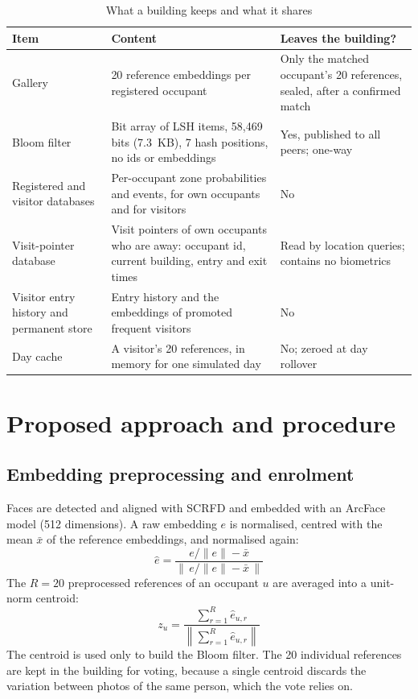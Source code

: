 \documentclass[12pt,a4paper,oneside]{report}
\begin{document}
\begin{table}[htbp]
\centering
\caption{What a building keeps and what it shares}\label{tab:stores}
{\small\setlength{\tabcolsep}{4pt}\renewcommand{\arraystretch}{1.2}
\begin{tabular}{|p{3.52cm}|p{6.06cm}|p{4.69cm}|}\hline
\textbf{Item} & \textbf{Content} & \textbf{Leaves the building?}\\\hline
Gallery & 20 reference embeddings per registered occupant & Only the matched occupant's 20 references, sealed, after a confirmed match\\\hline
Bloom filter & Bit array of LSH items, 58,469 bits (7.3~KB), 7 hash positions, no ids or embeddings & Yes, published to all peers; one-way\\\hline
Registered and visitor databases & Per-occupant zone probabilities and events, for own occupants and for visitors & No\\\hline
Visit-pointer database & Visit pointers of own occupants who are away: occupant id, current building, entry and exit times & Read by location queries; contains no biometrics\\\hline
Visitor entry history and permanent store & Entry history and the embeddings of promoted frequent visitors & No\\\hline
Day cache & A visitor's 20 references, in memory for one simulated day & No; zeroed at day rollover\\\hline
\end{tabular}}
\end{table}


\section{Proposed approach and procedure}
\subsection{Embedding preprocessing and enrolment}
Faces are detected and aligned with SCRFD \cite{ref18} and embedded with an ArcFace model \cite{ref17} (512 dimensions). A raw embedding $e$ is normalised, centred with the mean $\bar{x}$ of the reference embeddings, and normalised again:
\begin{equation}
\hat{e}=\frac{e/\|e\|-\bar{x}}{\left\|\,e/\|e\|-\bar{x}\,\right\|}
\end{equation}
The $R=20$ preprocessed references of an occupant $u$ are averaged into a unit-norm centroid:
\begin{equation}
z_u=\frac{\sum_{r=1}^{R}\hat{e}_{u,r}}{\left\|\sum_{r=1}^{R}\hat{e}_{u,r}\right\|}
\end{equation}
The centroid is used only to build the Bloom filter. The 20 individual references are kept in the building for voting, because a single centroid discards the variation between photos of the same person, which the vote relies on.
\end{document}
